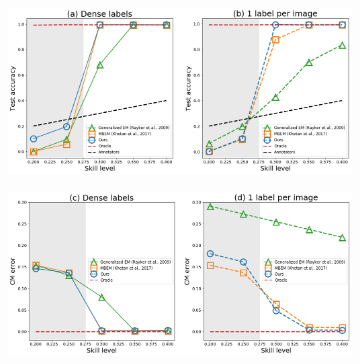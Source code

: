 \begin{figure}[ht]
	\center
	\begin{subfigure}[]{0.49\linewidth}
		\includegraphics[width=\linewidth]{chapter_4/figures/figures_new/figure_3_ab.png}
	\end{subfigure}
	\begin{subfigure}[]{0.49\linewidth}
		\includegraphics[width=\linewidth]{chapter_4/figures/figures_new/figure_3_cd.png}
	\end{subfigure}


\end{figure}
